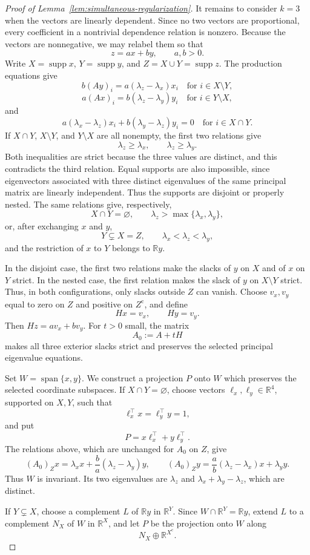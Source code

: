 \documentclass[11pt,a4paper]{article}
\theoremstyle{definition}
\newcommand{\R}{\mathbb R}
\newcommand{\supp}{\operatorname{supp}}
\begin{document}
\begin{proof}[Proof of Lemma~\ref{lem:simultaneous-regularization}]
It remains to consider $k=3$ when the vectors are linearly dependent.
Since no two vectors are proportional, every coefficient in a
nontrivial dependence relation is nonzero. Because the vectors are
nonnegative, we may relabel them so that
$$
z=ax+by,
\qquad
a,b>0.
$$
Write $X=\supp x$, $Y=\supp y$, and
$Z=X\cup Y=\supp z$. The production equations give
$$
b(Ay)_i=a(\lambda_z-\lambda_x)x_i
\quad\text{for }i\in X\setminus Y,
$$
$$
a(Ax)_i=b(\lambda_z-\lambda_y)y_i
\quad\text{for }i\in Y\setminus X,
$$
and
$$
a(\lambda_x-\lambda_z)x_i
+
b(\lambda_y-\lambda_z)y_i=0
\quad\text{for }i\in X\cap Y.
$$
If $X\cap Y$, $X\setminus Y$, and $Y\setminus X$ are all nonempty,
the first two relations give
$$
\lambda_z\geq\lambda_x,
\qquad
\lambda_z\geq\lambda_y.
$$
Both inequalities are strict because the three values are distinct,
and this contradicts the third relation. Equal supports are also
impossible, since eigenvectors associated with three distinct
eigenvalues of the same principal matrix are linearly independent.
Thus the supports are disjoint or properly nested. The same relations
give, respectively,
$$
X\cap Y=\varnothing,
\qquad
\lambda_z>\max\{\lambda_x,\lambda_y\},
$$
or, after exchanging $x$ and $y$,
$$
Y\subsetneq X=Z,
\qquad
\lambda_x<\lambda_z<\lambda_y,
$$
and the restriction of $x$ to $Y$ belongs to $\R y$.

In the disjoint case, the first two relations make the slacks of $y$
on $X$ and of $x$ on $Y$ strict. In the nested case, the first
relation makes the slack of $y$ on $X\setminus Y$ strict. Thus, in
both configurations, only slacks outside $Z$ can vanish. Choose
$v_x,v_y$ equal to zero on $Z$ and positive on $Z^{\mathrm c}$, and
define
$$
Hx=v_x,
\qquad
Hy=v_y.
$$
Then $Hz=av_x+bv_y$. For $t>0$ small, the matrix
$$
A_0:=A+tH
$$
makes all three exterior slacks strict and preserves the selected
principal eigenvalue equations.

Set $W=\operatorname{span}\{x,y\}$. We construct a projection $P$ onto
$W$ which preserves the selected coordinate subspaces. If
$X\cap Y=\varnothing$, choose vectors
$\ell_x,\ell_y\in\R^4$, supported on $X,Y$, such that
$$
\ell_x^\top x=\ell_y^\top y=1,
$$
and put
$$
P=x\ell_x^\top+y\ell_y^\top.
$$
The relations above, which are unchanged for $A_0$ on $Z$, give
$$
(A_0)_Zx
=
\lambda_xx+\frac ba(\lambda_z-\lambda_y)y,
\qquad
(A_0)_Zy
=
\frac ab(\lambda_z-\lambda_x)x+\lambda_yy.
$$
Thus $W$ is invariant. Its two eigenvalues are $\lambda_z$ and
$\lambda_x+\lambda_y-\lambda_z$, which are distinct.

If $Y\subsetneq X$, choose a complement $L$ of $\R y$ in $\R^Y$.
Since $W\cap\R^Y=\R y$, extend $L$ to a complement $N_X$ of $W$ in
$\R^X$, and let $P$ be the projection onto $W$ along
$$
N_X\oplus\R^{X^{\mathrm c}}.
$$


\end{proof}
\end{document}
